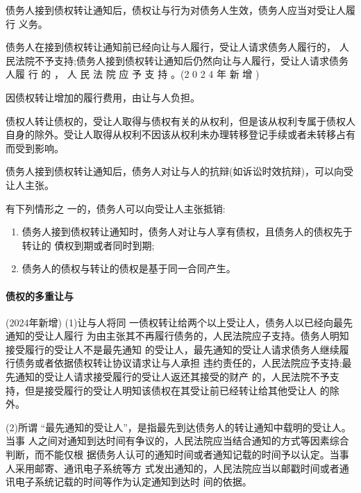 \documentclass[UTF8,12pt]{ctexart}
\numberwithin{equation}{section} %
\numberwithin{figure}{section}
\numberwithin{table}{section}
\begin{document}
	债务人接到债权转让通知后，债权让与行为对债务人生效，债务人应当对受让人履行 义务。
	
	债务人在接到债权转让通知前已经向让与人履行，受让人请求债务人履行的， 人民法院不予支持;债务人接到债权转让通知后仍然向让与人履行，受让人请求债务人履 行 的 ， 人 民 法 院 应 予 支 持 。(2 0 2 4 年 新 增 )
	
	因债权转让增加的履行费用，由让与人负担。
	
	债权人转让债权的，受让人取得与债权有关的从权利，但是该从权利专属于债权人自身的除外。受让人取得从权利不因该从权利未办理转移登记手续或者未转移占有而受到影响。
	
	债务人接到债权转让通知后，债务人对让与人的抗辩(如诉讼时效抗辩)，可以向受让人主张。
	
	有下列情形之 一的，债务人可以向受让人主张抵销: 
	\begin{enumerate}
		\item 债务人接到债权转让通知时，债务人对让与人享有债权，且债务人的债权先于转让的 債权到期或者同时到期;
		
		\item 债务人的债权与转让的债权是基于同一合同产生。
	\end{enumerate}

	
	\paragraph{债权的多重让与}(2024年新增)
	(1)让与人将同 一债权转让给两个以上受让人，债务人以已经向最先通知的受让人履行 为由主张其不再履行债务的，人民法院应子支持。债务人明知接受履行的受让人不是最先通知 的受让人，最先通知的受让人请求债务人继续履行债务或者依据债权转让协议请求让与人承担 违约责任的，人民法院应予支持;最先通知的受让人请求接受履行的受让人返还其接受的财产 的，人民法院不予支持，但是接受履行的受让人明知该债权在其受让前已经转让给其他受让人 的除外。

	(2)所谓 “最先通知的受让人”，是指最先到达债务人的转让通知中载明的受让人。当事 人之间对通知到达时间有争议的，人民法院应当结合通知的方式等因素综合判断，而不能仅根 据债务人认可的通知时间或者通知记载的时间予以认定。当事人采用邮寄、通讯电子系统等方 式发出通知的，人民法院应当以邮戳时间或者通讯电子系统记载的时间等作为认定通知到达时 间的依据。
	
\end{document}
